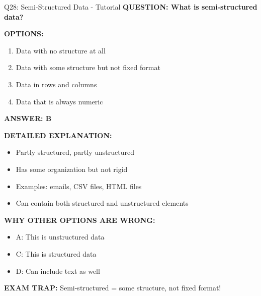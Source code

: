 \documentclass[8pt]{beamer}
\begin{document}
	\begin{frame}{Q28: Semi-Structured Data - Tutorial}
		\fontsize{6.5}{7.5}\selectfont
		\textbf{QUESTION: What is semi-structured data?}
		
		\vspace{0.1cm}
		\textbf{OPTIONS:}
		\begin{enumerate}
			\item Data with no structure at all
			\item Data with some structure but not fixed format
			\item Data in rows and columns
			\item Data that is always numeric
		\end{enumerate}
		
		\vspace{0.1cm}
		\textcolor{myblue}{\textbf{ANSWER: B}}
		
		\vspace{0.1cm}
		\textbf{DETAILED EXPLANATION:}
		\begin{itemize}
			\item Partly structured, partly unstructured
			\item Has some organization but not rigid
			\item Examples: emails, CSV files, HTML files
			\item Can contain both structured and unstructured elements
		\end{itemize}
		
		\vspace{0.1cm}
		\textcolor{myred}{\textbf{WHY OTHER OPTIONS ARE WRONG:}}
		\begin{itemize}
			\item \textcolor{myred}{A:} This is unstructured data
			\item \textcolor{myred}{C:} This is structured data
			\item \textcolor{myred}{D:} Can include text as well
		\end{itemize}
		
		\textcolor{myred}{\textbf{EXAM TRAP:}} Semi-structured = \textcolor{myblue}{some structure, not fixed format}!
	\end{frame}
	
\end{document}
